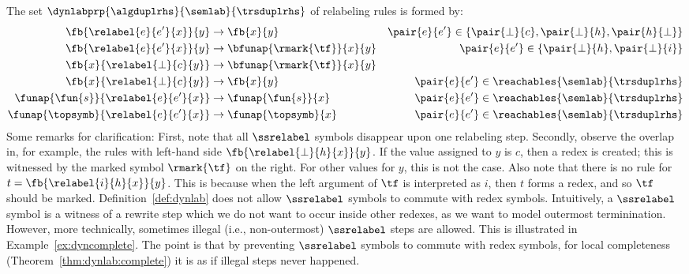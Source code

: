 \begin{example}
  The set $\dynlabprp{\algduplrhs}{\semlab}{\trsduplrhs}$ 
  of relabeling rules is formed by:
  \begin{align*}
    \fb{\relabel{e}{e'}{x}}{y}
    & \to \fb{x}{y} 
    & \text{$\pair{e}{e'} \in \{ \pair{\bot}{c} , \pair{\bot}{h} , \pair{h}{\bot} \}$}
    \\
    \fb{\relabel{e}{e'}{x}}{y}
    & \to \bfunap{\rmark{\tf}}{x}{y}
    & \text{$\pair{e}{e'}\in\{\pair{\bot}{h} , \pair{\bot}{i}\}$}
    \\
    \fb{x}{\relabel{\bot}{c}{y}}
    & \to \bfunap{\rmark{\tf}}{x}{y} 
    \\
    \fb{x}{\relabel{\bot}{c}{y}}
    & \to \fb{x}{y} 
    & \text{$\pair{e}{e'} \in \reachables{\semlab}{\trsduplrhs}$}
    \\
    \funap{\fun{s}}{\relabel{e}{e'}{x}}
    & \to \funap{\fun{s}}{x} 
    & \text{$\pair{e}{e'}\in\reachables{\semlab}{\trsduplrhs}$}
    \\
    \funap{\topsymb}{\relabel{e}{e'}{x}}
    & \to \funap{\topsymb}{x} 
    & \text{$\pair{e}{e'}\in\reachables{\semlab}{\trsduplrhs}$}
  \end{align*}
  Some remarks for clarification: 
  First, note that all $\ssrelabel$ symbols disappear upon one relabeling step.
  Secondly, observe the overlap in, for example, the rules with left-hand side 
  $\fb{\relabel{\bot}{h}{x}}{y}$.
  If the value assigned to $y$ is $c$, 
  then a redex is created; this is witnessed by the marked symbol $\rmark{\tf}$ on the right.
  For other values for $y$, this is not the case.
  Also note that there is no rule for
  $t = \fb{\relabel{i}{h}{x}}{y}$. 
  This is because when the left argument of $\tf$ is interpreted as $i$,
  then $t$ forms a redex, and so $\tf$ should be marked. 
  Definition~\ref{def:dynlab} does not allow $\ssrelabel$ symbols 
  to commute with redex symbols.
  Intuitively, a $\ssrelabel$ symbol is a witness of a rewrite step 
  which we do not want to occur inside other redexes, as we want to model outermost terminination. 
  However, more technically, sometimes illegal (i.e., non-outermost) $\ssrelabel$ steps are allowed.
  This is illustrated in Example~\ref{ex:dyncomplete}.
  The point is that by preventing $\ssrelabel$ symbols to commute with redex symbols,
  for local completeness (Theorem~\ref{thm:dynlab:complete})
  it is as if illegal steps never happened.
\end{example}

